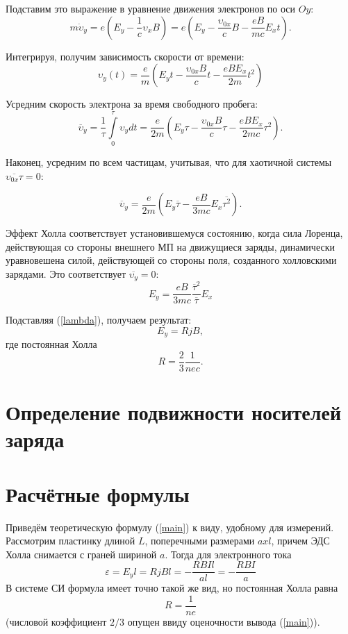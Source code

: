\documentclass[a4paper, 12pt]{article}
\begin{document}
{Подставим это выражение в уравнение движения электронов по оси $Oy$:
$$m\dot \upsilon_y = e \left(E_y-\frac{1}{c} \upsilon_xB \right)= e\left(E_y - \frac{\upsilon_{0x}}{c}B-\frac{eB}{mc}E_x t \right).$$

Интегрируя, получим зависимость скорости от времени:
$$\upsilon_y(t) = \frac{e}{m}\left( E_y t - \frac{\upsilon_{0x}B}{c}t-\frac{eBE_x}{2m}t^2\right)$$ 

Усредним скорость электрона за время свободного пробега:
$$\overline \upsilon_y = \frac{1}{\tau}\int\limits_0^\tau \upsilon_y dt = \frac{e}{2m} \left( E_y \tau - \frac{\upsilon_{0x}B}{c} \tau - \frac{eBE_x}{2mc}\tau^2 \right).$$

Наконец, усредним по всем частицам, учитывая,  что для хаотичной системы $\overline{\upsilon_{0x}\tau} = 0$:


$$\overline \upsilon_y  = \frac{e}{2m}\left(E_y \overline{\tau} -\frac{eB}{3mc}E_x \overline{\tau^2}\right).$$

Эффект Холла соответствует установившемуся состоянию, когда сила Лоренца, действующая со стороны внешнего МП на движущиеся заряды, динамически уравновешена силой, действующей со стороны поля, созданного холловскими зарядами. Это соответствует $\overline{\upsilon_y} = 0$:
$$E_y = \frac{eB}{3mc}\frac{\overline \tau^2}{\overline \tau} E_x$$

Подставляя (\ref{lambda}), получаем результат:
\begin{equation} \label{main}
E_y=RjB,
\end{equation}
где постоянная Холла
$$R=\frac{2}{3}\frac{1}{nec}.$$


\section{Определение подвижности носителей заряда}
\section*{Расчётные формулы}
Приведём теоретическую формулу (\ref{main}) к виду, удобному для измерений. Рассмотрим пластинку длиной $L$, поперечными размерами $axl$, причем ЭДС Холла снимается с граней шириной $a$. Тогда для электронного тока
\begin{equation}\label{eds}
\varepsilon = E_yl = RjBl = -\frac{RBIl}{al}=-\frac{RBI}{a}
\end{equation}
В системе СИ формула имеет точно такой же вид, но постоянная Холла равна
$$R = \frac{1}{ne}$$
(числовой коэффициент $2/3$ опущен ввиду оценочности вывода (\ref{main})).

}
\end{document}
